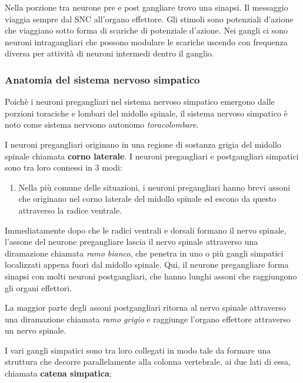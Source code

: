 \documentclass[]{article}
\begin{document}
Nella porzione tra neurone pre e post gangliare trovo una sinapsi. Il
messaggio viaggia sempre dal SNC all'organo effettore. Gli stimoli sono
potenziali d'azione che viaggiano sotto forma di scariche di potenziale
d'azione. Nei gangli ci sono neuroni intragangliari che possono modulare
le scariche uscendo con frequenza diversa per attività di neuroni
intermedi dentro il ganglio.

\subsubsection{Anatomia del sistema nervoso
simpatico}\label{anatomia-del-sistema-nervoso-simpatico}

Poichè i neuroni pregangliari nel sistema nervoso simpatico emergono
dalle porzioni toraciche e lombari del midollo spinale, il sistema
nervoso simpatico è noto come sistema nervsono autonomo
\emph{toracolombare}.

I neuroni pregangliari originano in una regione di sostanza grigia del
midollo spinale chiamata \textbf{corno laterale}. I neuroni pregangliari
e postgangliari simpatici sono tra loro connessi in 3 modi:

\begin{enumerate}
\def\labelenumi{\arabic{enumi}.}
\itemsep1pt\parskip0pt
\item
  Nella più comune delle situazioni, i neuroni pregangliari hanno brevi
  assoni che originano nel corno laterale del midollo spinale ed escono
  da questo attraverso la radice ventrale.
\end{enumerate}

Immediatamente dopo che le radici ventrali e dorsali formano il nervo
spinale, l'assone del neurone pregangliare lascia il nervo spinale
attraverso una diramazione chiamata \emph{ramo bianco}, che penetra in
uno o più gangli simpatici localizzati appena fuori dal midollo spinale.
Qui, il neurone pregangliare forma sinapsi con molti neuroni
postgangliari, che hanno lunghi assoni che raggiungono gli organi
effettori.

La maggior parte degli assoni postgangliari ritorna al nervo spinale
attraverso una diramazione chiamata \emph{ramo grigio} e raggiunge
l'organo effettore attraverso un nervo spinale.

I vari gangli simpatici sono tra loro collegati in modo tale da formare
una struttura che decorre parallelamente alla colonna vertebrale, ai due
lati di essa, chiamata \textbf{catena simpatica};
\end{document}
